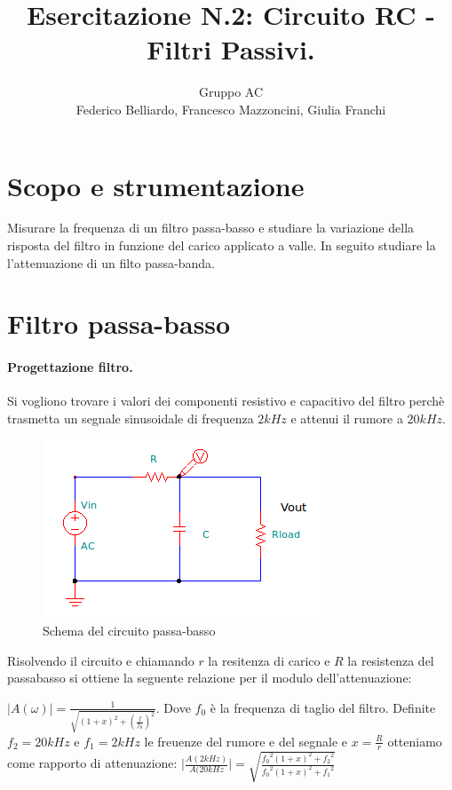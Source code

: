 \documentclass[10pt,a4paper]{article}
\author{Gruppo AC \\ Federico Belliardo, Francesco Mazzoncini, Giulia Franchi}
\title{Esercitazione N.2: Circuito RC - Filtri Passivi.}
\begin{document}
\maketitle

\section{Scopo e strumentazione}

Misurare la frequenza di un filtro passa-basso e studiare la variazione della risposta del filtro in funzione del carico applicato a valle. In seguito studiare la l'attenuazione di un filto passa-banda. 

\section{Filtro passa-basso}

\paragraph{Progettazione filtro.}
Si vogliono trovare i valori dei componenti resistivo e capacitivo del filtro perchè trasmetta un segnale sinusoidale di frequenza $2kHz$ e attenui il rumore a $20kHz$.

\begin{figure}[h]
\centering
\includegraphics[scale=1.0]{passabasso.png}
\caption{Schema del circuito passa-basso}
\end{figure}

Risolvendo il circuito e chiamando $r$ la resitenza di carico e $R$ la resistenza del passabasso si ottiene la seguente relazione per il modulo dell'attenuazione:

$\vert A(\omega) \vert = \frac{1}{\sqrt{(1+x)^2+(\frac{f}{f_{0}})^2}} $. Dove $f_0$ è la frequenza di taglio del filtro. Definite $f_2 = 20 kHz$ e $f_1 = 2 kHz$ le freuenze del rumore e del segnale e $x = \frac {R}{r}$ otteniamo come rapporto di attenuazione: 
$\vert \frac{A(2 kHz)}{A(20 kHz} \vert = \sqrt{\frac{{f_0}^2 (1+x)^2 + {f_2}^2}{{f_0}^2 (1+x)^2 + {f_1}^2}}$
\end{document}
